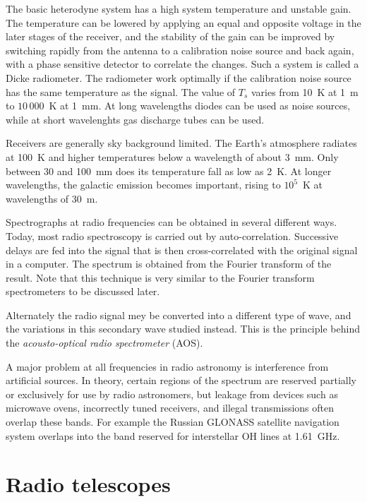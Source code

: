 The basic heterodyne system has a high system temperature and unstable gain.
The temperature can be lowered by applying an equal and opposite voltage in the
later stages of the receiver, and the stability of the gain can be improved by
switching rapidly from the antenna to a calibration noise source and back again, 
with a phase sensitive detector to correlate the changes. Such a system is called 
a Dicke radiometer. The radiometer work optimally if the calibration noise source
has the same temperature as the signal. The value of $T_s$ varies from 10~K at 
1~m to $10\,000$~K at 1~mm. At long wavelengths diodes can be used as noise 
sources, while at short wavelenghts gas discharge tubes can be used.

Receivers are generally sky background limited. The Earth's atmosphere 
radiates at 100~K and higher temperatures below a wavelength of about
3~mm. Only between 30 and 100~mm does its temperature fall as low as 
2~K. At longer wavelengths, the galactic emission becomes important, rising
to $10^5$~K at wavelengths of 30~m.

Spectrographs at radio frequencies can be obtained in several different ways. 
Today, most radio spectroscopy is carried out by auto-correlation. Successive
delays are fed into the signal that is then cross-correlated with the original
signal in a computer. The spectrum is obtained from the Fourier transform
of the result. Note that this technique is very similar to the Fourier
transform spectrometers to be discussed later.

Alternately the radio signal mey be converted into a different type of
wave, and the variations in this secondary wave studied instead. This
is the principle behind the {\it acousto-optical radio spectrometer} (AOS).

A major problem at all frequencies in radio astronomy is interference from
artificial sources. In theory, certain regions of the spectrum are reserved
partially or exclusively for use by radio astronomers, but leakage from
devices such as microwave ovens, incorrectly tuned receivers, and illegal 
transmissions often overlap these bands. For example the Russian GLONASS
satellite navigation system overlaps into the band reserved for interstellar
OH lines at 1.61~GHz.

\section{Radio telescopes} %

